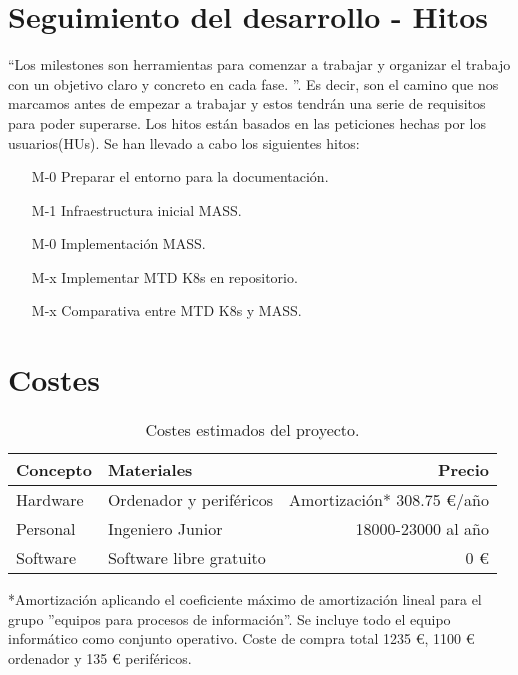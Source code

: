 \section{Seguimiento del desarrollo - Hitos}
``Los milestones son herramientas para comenzar a trabajar y organizar el trabajo con un objetivo claro y concreto en cada fase.
''\cite{iv}. Es decir, son el camino que nos marcamos antes de empezar a trabajar y estos tendrán una serie de requisitos para poder superarse. Los hitos están basados en las peticiones hechas por los usuarios(HUs). Se han llevado a cabo los siguientes hitos:
\begin{itemize}
    \item [M-0] Preparar el entorno para la documentación.
    \item [M-1] Infraestructura inicial MASS.
    \item [M-0] Implementación MASS.
    \item [M-x] Implementar MTD K8s en repositorio.
    \item [M-x] Comparativa entre MTD K8s y MASS.
\end{itemize}


\section{Costes}
\begin{table}[H]
	\centering
	\begin{tabular}{| l | l | r |}
        \hline
        \textbf{Concepto} & \textbf{Materiales} & \textbf{Precio} \\
        \hline
        Hardware	& Ordenador y periféricos & Amortización* 308.75 €/año\\
        Personal 	& Ingeniero Junior	& 18000-23000 al año \\
        Software 	& Software libre gratuito & 0 € \\
        \hline
        \hline
	\end{tabular}
	\caption{Costes estimados del proyecto.}
\end{table}

*Amortización aplicando el coeficiente máximo de amortización lineal para el grupo ''equipos para procesos de información''\cite{amortizacion}. Se incluye todo el equipo informático como conjunto operativo. Coste de compra total 1235 €, 1100 € ordenador y 135 € periféricos.